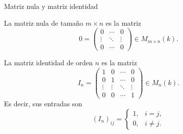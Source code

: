 \begin{frame}{Matriz nula y matriz identidad}

\begin{definition}
La \alert{matriz nula} de tamaño \(m\times n\) es la matriz
\[
0=
\begin{pmatrix}
0 & \cdots & 0\\
\vdots & \ddots & \vdots\\
0 & \cdots & 0
\end{pmatrix}
\in M_{m\times n}(k).
\]
\end{definition}

\pause

\begin{definition}
La \alert{matriz identidad} de orden \(n\) es la matriz
\[
I_n=
\begin{pmatrix}
1 & 0 & \cdots & 0\\
0 & 1 & \cdots & 0\\
\vdots & \vdots & \ddots & \vdots\\
0 & 0 & \cdots & 1
\end{pmatrix}
\in M_n(k).
\]
Es decir, sus entradas son
\[
(I_n)_{ij}=
\begin{cases}
1,& i=j,\\
0,& i\neq j.
\end{cases}
\]
\end{definition}

\end{frame}

